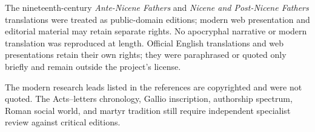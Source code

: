 The nineteenth-century \emph{Ante-Nicene Fathers} and \emph{Nicene and
Post-Nicene Fathers} translations were treated as public-domain editions;
modern web presentation and editorial material may retain separate rights. No
apocryphal narrative or modern translation was reproduced at length. Official
English translations and web presentations retain their own rights; they were
paraphrased or quoted only briefly and remain outside the project's license.

The modern research leads listed in the references are copyrighted and were
not quoted. The Acts--letters chronology, Gallio inscription, authorship
spectrum, Roman social world, and martyr tradition still require independent
specialist review against critical editions.
